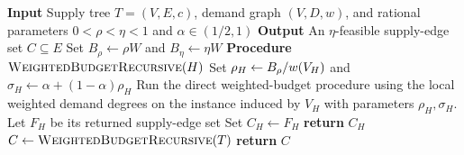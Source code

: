 \begin{algorithm}[tbp]
    \caption{Recursive weighted-budget partitioning}
    \textbf{Input} Supply tree $T=(V,E,c)$, demand graph $(V,D,w)$, and rational parameters $0<\rho<\eta<1$ and $\alpha\in(1/2,1)$\;
    \textbf{Output} An $\eta$-feasible supply-edge set $C\subseteq E$\;
    Set $B_\rho\gets\rho W$ and $B_\eta\gets\eta W$\;
    \textbf{Procedure} $\textsc{WeightedBudgetRecursive}(H)$\;
    \Indp
        Set $\rho_H\gets B_\rho/w\mathopen{}\left( V_H \right)$ and $\sigma_H\gets\alpha+(1-\alpha)\rho_H$\;
        Run the direct weighted-budget procedure using the local weighted demand degrees on the instance induced by $V_H$ with parameters $\rho_H,\sigma_H$. Let $F_H$ be its returned supply-edge set\;
        Set $C_H\gets F_H$\;
        \textbf{return} $C_H$\;
    \Indm
    $C\gets\textsc{WeightedBudgetRecursive}(T)$\;
    \textbf{return} $C$\;
\end{algorithm}